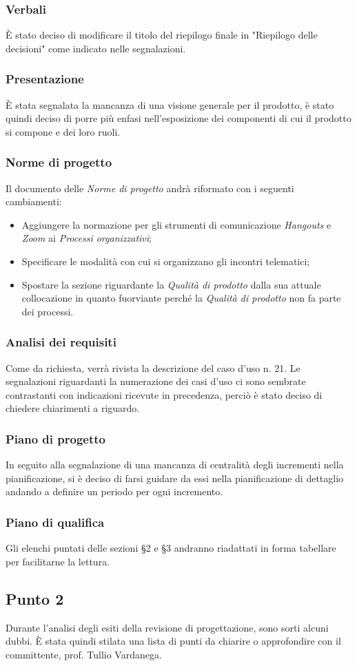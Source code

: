         \subsubsection{Verbali}
            È stato deciso di modificare il titolo del riepilogo finale in "Riepilogo delle decisioni" come indicato nelle segnalazioni.
        \subsubsection{Presentazione}
            È stata segnalata la mancanza di una visione generale per il prodotto, è stato quindi deciso di porre più enfasi nell'esposizione dei componenti di cui il prodotto si compone e dei loro ruoli.
        \subsubsection{Norme di progetto}
            Il documento delle \textit{Norme di progetto} andrà riformato con i seguenti cambiamenti:
            \begin{itemize}
                \item Aggiungere la normazione per gli strumenti di comunicazione \textit{Hangouts} e \textit{Zoom} ai \textit{Processi organizzativi};
                \item  Specificare le modalità con cui si organizzano gli incontri telematici;
                \item Spostare la sezione riguardante la \textit{Qualità di prodotto} dalla sua attuale collocazione in quanto fuorviante perché la \textit{Qualità di prodotto} non fa parte dei processi.
            \end{itemize}
        \subsubsection{Analisi dei requisiti}
            Come da richiesta, verrà rivista la descrizione del caso d'uso n. 21. Le segnalazioni riguardanti la numerazione dei casi d'uso ci sono sembrate contrastanti con indicazioni ricevute in precedenza, perciò è stato deciso di chiedere chiarimenti a riguardo.
        \subsubsection{Piano di progetto}
            In seguito alla segnalazione di una mancanza di centralità degli incrementi nella pianificazione, si è deciso di farsi guidare da essi nella pianificazione di dettaglio andando a definire un periodo per ogni incremento.
        \subsubsection{Piano di qualifica}
            Gli elenchi puntati delle sezioni §2 e §3 andranno riadattati in forma tabellare per facilitarne la lettura.
    \subsection{Punto 2}
        Durante l'analisi degli esiti della revisione di progettazione, sono sorti alcuni dubbi. È stata quindi stilata una lista di punti da chiarire o approfondire con il committente, prof. Tullio Vardanega.
